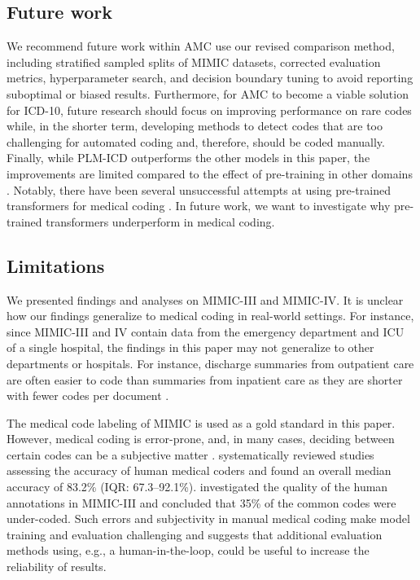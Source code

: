 {\subsection{Future work}
We recommend future work within AMC use our revised comparison method, including stratified sampled splits of MIMIC datasets, corrected evaluation metrics, hyperparameter search, and decision boundary tuning to avoid reporting suboptimal or biased results. 
Furthermore, for AMC to become a viable solution for ICD-10, future research should focus on improving performance on rare codes while, in the shorter term, developing methods to detect codes that are too challenging for automated coding and, therefore, should be coded manually. Finally, while PLM-ICD outperforms the other models in this paper, the improvements are limited compared to the effect of pre-training in other domains \cite{mohamed_selfsupervised_2022, linPretrainedTransformersText2021,baevski_wav2vec_2020,devlin_bert_2018,dosovitskiy_image_2021}.
Notably, there have been several unsuccessful attempts at using pre-trained transformers for medical coding \cite{jiDoesMagicBERT2021,gaoLimitationsTransformersClinical2021,michalopoulosICDBigBirdContextualEmbedding2022,pascualBERTbasedAutomaticICD2021,zhangBERTXMLLargeScale2020}. In future work, we want to investigate why pre-trained transformers underperform in medical coding.


\subsection{Limitations}
We presented findings and analyses on MIMIC-III and MIMIC-IV. It is unclear how our findings generalize to medical coding in real-world settings.
For instance, since MIMIC-III and IV contain data from the emergency department and ICU of a single hospital, the findings in this paper may not generalize to other departments or hospitals. 
For instance, discharge summaries from outpatient care are often easier to code than summaries from inpatient care as they are shorter with fewer codes per document \cite{zhangBERTXMLLargeScale2020, liuEffectiveConvolutionalAttention2021, tsengAdministrativeCostsAssociated2018}.

The medical code labeling of MIMIC is used as a gold standard in this paper. However, medical coding is error-prone, and, in many cases, deciding between certain codes can be a subjective matter \cite{nouraeiAuditNatureImpact2013, lloydPhysicianCodingErrors1985}. \citet{burnsSystematicReviewDischarge2012} systematically reviewed studies assessing the accuracy of human medical coders and found an overall median accuracy of 83.2\% (IQR: 67.3–92.1\%). \citet{searleExperimentalEvaluationDevelopment2020} investigated the quality of the human annotations in MIMIC-III and concluded that 35\% of the common codes were under-coded. Such errors and subjectivity in manual medical coding make model training and evaluation challenging and suggests that additional evaluation methods using, e.g., a human-in-the-loop, could be useful to increase the reliability of results. 

}
